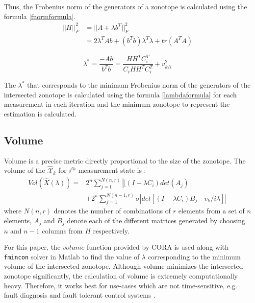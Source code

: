 Thus, the Frobenius norm of the generators of a zonotope is calculated using the formula \eqref{fnormformula}\cite{Alamo2005}.
\begin{equation}
\label{fnormformula}
\begin{split}
||H||_{F}^2 & = ||A + \lambda b^T||^{2}_F \\
&= 2\lambda^T A b+ (b^Tb)\lambda^T\lambda + tr(A^TA)
\end{split}
\end{equation}

\begin{equation}
\label{lambdaformula}
\lambda^* = \frac{-Ab }{b^Tb}  = \frac{HH^TC_i^T}{C_i HH^TC_i^T} + v_{k/i}^2
\end{equation}

The $\lambda^*$ that corresponds to the minimum Frobenius norm of the generators of the intersected zonotope is calculated using the formula \eqref{lambdaformula} for each measurement in each iteration and the minimum zonotope to represent the estimation is calculated.

\subsection{Volume}
Volume is a precise metric directly proportional to the size of the zonotope. The volume of the $\mathcal{\hat{X}}_k$ for $i^{th}$ measurement state is \cite{Alamo2005}:
\begin{equation}
\label{volumeformula}
\begin{split}
Vol(\hat{X}(\lambda))=& 2^n \sum^{N(n,r)}_{j=1} |[(I - \lambda C_i)det(A_j)|\\
&+ 2^n \sum^{N(n-1,r)}_{j=1} \sigma|det[(I- \lambda C_i)B_j\quad v_k/i\lambda]|
\end{split}
\end{equation}
where $N(n,r)$ denotes the number of combinations of $r$ elements from a set of $n$ elements, $A_j$ and $B_j$ denote each of the different matrices generated by choosing $n$ and $n-1$ columns from $H$ respectively. 

For this paper, the $volume$ function provided by CORA is used along with \texttt{fmincon} solver in Matlab\textsuperscript{\tiny\textregistered} to find the value of $\lambda$ corresponding to the minimum volume of the intersected zonotope. Although volume minimizes the intersected zonotope significantly, the calculation of volume is extremely computationally heavy. Therefore, it works best for use-cases which are not time-sensitive, e.g. fault diagnosis and fault tolerant control systems \cite{Puig2010} . 


